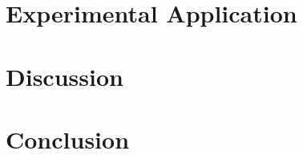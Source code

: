 \documentclass[draft,final]{vutinfth} %
\theoremstyle{definition}
\begin{document}
\chapter{Experimental Application}
\label{chap:application-experiment}


\chapter{Discussion}
\label{chap:discussion}


\chapter{Conclusion}
\label{chap:conclusion}


\appendix


\backmatter

\listoffigures %

\cleardoublepage %
\listoftables %

\listofalgorithms
{}

\printindex

\printglossaries



\end{document}
